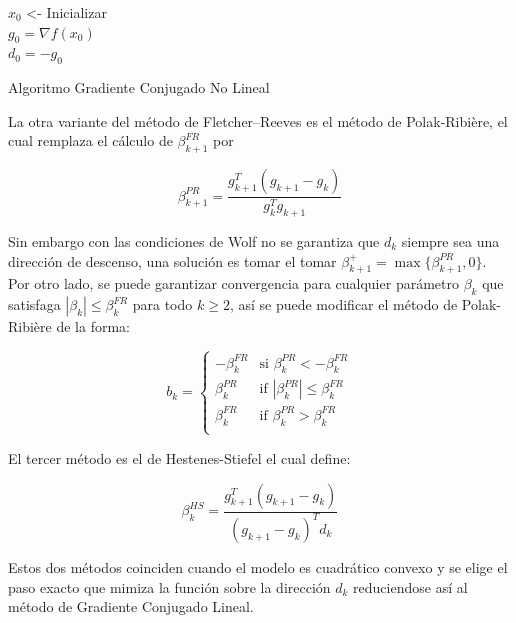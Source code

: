 \documentclass[conference]{IEEEtran}
\begin{document}
\begin{algorithm}[h]
    \SetAlgoLined
	$x_0$ <- Inicializar \\
	$g_0 = \nabla f(x_0)$ \\
	$d_0 = -g_0$ \\
    \caption{Algoritmo Gradiente Conjugado No Lineal}
\end{algorithm}


La otra variante del método de Fletcher–Reeves es el método de Polak-Ribière, el cual remplaza el
cálculo de $\beta_{k+1}^{FR}$ por

$$
\beta_{k+1}^{PR} = \frac{g_{k+1}^T (g_{k+1} - g_k)}{g_{k}^Tg_{k+1}}
$$

Sin embargo con las condiciones de Wolf no se garantiza que $d_k$ siempre sea una dirección de
descenso, una solución es tomar el tomar $\beta_{k+1}^+ = \max\{\beta_{k+1}^{PR}, 0\}$. Por otro
lado, se puede garantizar convergencia para cualquier parámetro $\beta_k$ que satisfaga
$|\beta_k| \le \beta_k^{FR}$ para todo $k \ge 2$, así se puede modificar el método de Polak-Ribière
de la forma:

$$
b_k =
\left\{
	\begin{array}{ll}
		-\beta_{k}^{FR}  & \mbox{si } \beta_{k}^{PR} < -\beta_{k}^{FR} \\
        \beta_{k}^{PR} & \mbox{if } |\beta_{k}^{PR}| \le \beta_{k}^{FR} \\
        \beta_{k}^{FR} & \mbox{if } \beta_{k}^{PR} > \beta_{k}^{FR} \\
	\end{array}
\right.
$$

El tercer método es el de Hestenes-Stiefel el cual define:

$$
\beta_{k}^{HS} = \frac{g_{k+1}^T (g_{k+1} - g_k)}{(g_{k+1} - g_{k})^T d_k}
$$

Estos dos métodos coinciden cuando el modelo es cuadrático convexo y se elige el paso exacto que
mimiza la función sobre la dirección $d_k$ reduciendose así al método de Gradiente Conjugado Lineal.
\end{document}
